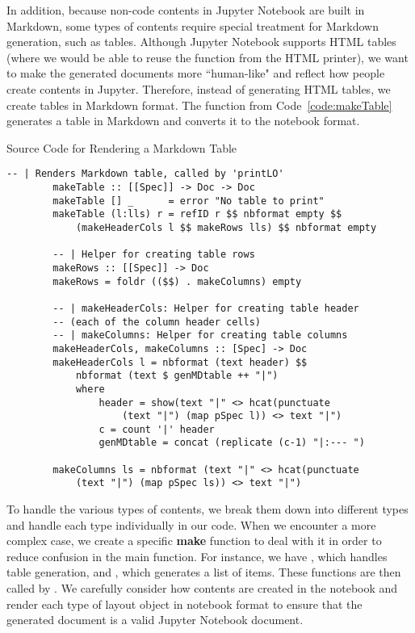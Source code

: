 In addition, because non-code contents in Jupyter Notebook are built in 
Markdown, some types of contents require special treatment for Markdown 
generation, such as tables. Although Jupyter Notebook supports HTML tables 
(where we would be able to reuse the function from the HTML printer), we want 
to make the generated documents more ``human-like" and reflect how people 
create contents in Jupyter. Therefore, instead of generating HTML tables, we 
create tables in Markdown format. The function  from 
Code~\ref{code:makeTable} generates a table in Markdown and converts it to the
notebook format.

\begin{listing}[h!]
	\caption{Source Code for Rendering a Markdown Table}
	\label{code:makeTable}
	\begin{lstlisting}[language=haskell1]
		-- | Renders Markdown table, called by 'printLO'
		makeTable :: [[Spec]] -> Doc -> Doc
		makeTable [] _      = error "No table to print"
		makeTable (l:lls) r = refID r $$ nbformat empty $$ 
			(makeHeaderCols l $$ makeRows lls) $$ nbformat empty
		
		-- | Helper for creating table rows
		makeRows :: [[Spec]] -> Doc
		makeRows = foldr (($$) . makeColumns) empty
		
		-- | makeHeaderCols: Helper for creating table header
		-- (each of the column header cells)
		-- | makeColumns: Helper for creating table columns
		makeHeaderCols, makeColumns :: [Spec] -> Doc
		makeHeaderCols l = nbformat (text header) $$ 
			nbformat (text $ genMDtable ++ "|")
			where 
				header = show(text "|" <> hcat(punctuate 
					(text "|") (map pSpec l)) <> text "|")        
				c = count '|' header
				genMDtable = concat (replicate (c-1) "|:--- ")
		
		makeColumns ls = nbformat (text "|" <> hcat(punctuate 
			(text "|") (map pSpec ls)) <> text "|")
	\end{lstlisting}
\end{listing}

To handle the various types of contents, we break them down into different 
types and handle each type individually in our code. When we encounter a more 
complex case, we create a specific \textbf{make} function to deal with it in 
order to reduce confusion in the main  function. For instance, 
we have , which handles table generation, and 
, which generates a list of items. These functions are then 
called by . We carefully consider how contents are created in 
the notebook and render each type of layout object in notebook format to ensure 
that the generated document is a valid Jupyter Notebook document.

